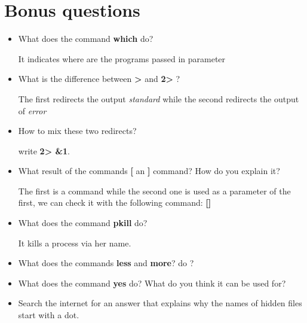 \documentclass[11pt]{article}
\begin{document}
\section{Bonus questions}

\begin{itemize}
\item What does the command \textbf{which} do?
  \begin{solution}
    It indicates where are the programs passed in parameter
  \end{solution}
\item What is the difference between \textbf{>} and \textbf{2>} ?
  \begin{solution}
    The first redirects the output \textit{standard} while the second redirects the output of \textit{error}
  \end{solution}
\item How to mix these two redirects?
  \begin{solution}
    write \textbf{2> \&1}.
  \end{solution}
\item What result of the commands \textbf{[} an \textbf{]} command? How do you explain it?
  \begin{solution}
    The first is a command while the second one is used as a parameter of the first, we can check it with the following command: \textbf{[]}
  \end{solution}
\item What does the command \textbf{pkill} do?
  \begin{solution}
    It kills a process via her name.
  \end{solution}
\item What does the commands \textbf{less} and \textbf {more}? do ?
\item What does the command \textbf{yes} do? What do you think it can be used for?
\item Search the internet for an answer that explains why the names of hidden files start with a dot.

\end{itemize}
\end{document}
